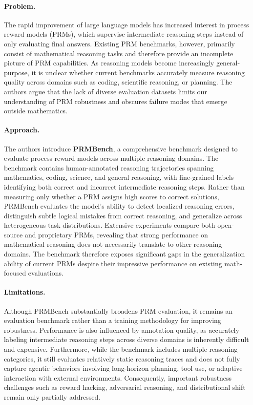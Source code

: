 \documentclass[11pt]{article}
\begin{document}
\paragraph{Problem.}
The rapid improvement of large language models has increased interest in process reward models (PRMs), which supervise intermediate reasoning steps instead of only evaluating final answers. Existing PRM benchmarks, however, primarily consist of mathematical reasoning tasks and therefore provide an incomplete picture of PRM capabilities. As reasoning models become increasingly general-purpose, it is unclear whether current benchmarks accurately measure reasoning quality across domains such as coding, scientific reasoning, or planning. The authors argue that the lack of diverse evaluation datasets limits our understanding of PRM robustness and obscures failure modes that emerge outside mathematics.

\paragraph{Approach.}
The authors introduce \textbf{PRMBench}, a comprehensive benchmark designed to evaluate process reward models across multiple reasoning domains. The benchmark contains human-annotated reasoning trajectories spanning mathematics, coding, science, and general reasoning, with fine-grained labels identifying both correct and incorrect intermediate reasoning steps. Rather than measuring only whether a PRM assigns high scores to correct solutions, PRMBench evaluates the model's ability to detect localized reasoning errors, distinguish subtle logical mistakes from correct reasoning, and generalize across heterogeneous task distributions. Extensive experiments compare both open-source and proprietary PRMs, revealing that strong performance on mathematical reasoning does not necessarily translate to other reasoning domains. The benchmark therefore exposes significant gaps in the generalization ability of current PRMs despite their impressive performance on existing math-focused evaluations.

\paragraph{Limitations.}
Although PRMBench substantially broadens PRM evaluation, it remains an evaluation benchmark rather than a training methodology for improving robustness. Performance is also influenced by annotation quality, as accurately labeling intermediate reasoning steps across diverse domains is inherently difficult and expensive. Furthermore, while the benchmark includes multiple reasoning categories, it still evaluates relatively static reasoning traces and does not fully capture agentic behaviors involving long-horizon planning, tool use, or adaptive interaction with external environments. Consequently, important robustness challenges such as reward hacking, adversarial reasoning, and distributional shift remain only partially addressed.
\end{document}
